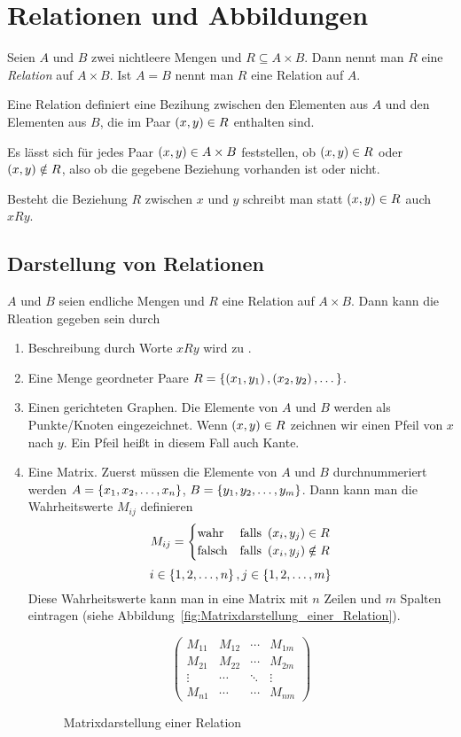 \chapter{Relationen und Abbildungen}
\begin{definition}[Relation]
Seien $A$ und $B$ zwei nichtleere Mengen und $R \subseteq A \times B$. Dann nennt man $R$ eine \emph{Relation} auf $A \times B$. Ist $A = B$ nennt man $R$ eine Relation auf $A$.
\end{definition}

Eine Relation definiert eine Bezihung zwischen den Elementen aus $A$ und  den Elementen aus $B$, die im Paar $\left(x, y\right) \in R$ enthalten sind.

Es lässt sich für jedes Paar $\left(x, y\right) \in A \times B$ feststellen, ob $\left(x, y\right) \in R$ oder $\left(x, y\right) \notin R$, also ob die gegebene Beziehung vorhanden ist oder nicht.

Besteht die Beziehung $R$ zwischen $x$ und $y$ schreibt man statt $\left(x, y\right) \in R$ auch $xRy$.

\section{Darstellung von Relationen}
$A$ und $B$ seien endliche Mengen und $R$ eine Relation auf $A \times B$. Dann kann die Rleation gegeben sein durch
\begin{enumerate}
\item Beschreibung durch Worte $xRy$ wird zu .
\item Eine Menge geordneter Paare $R = \left\{\left(x_1, y_1\right), \left(x_2, y_2\right), \dots\right\}$.
\item Einen gerichteten Graphen. Die Elemente von $A$ und $B$ werden als Punkte/Knoten eingezeichnet. Wenn $\left(x, y\right) \in R$ zeichnen wir einen Pfeil von $x$ nach $y$. Ein Pfeil heißt in diesem Fall auch Kante.
\item Eine Matrix. Zuerst müssen die Elemente von $A$ und $B$ durchnummeriert werden $A = \left\{x_1, x_2, \dots, x_n\right\}$, $B = \left\{y_1, y_2, \dots, y_m\right\}$. Dann kann man die Wahrheitswerte $M_{ij}$ definieren
	\[M_{ij} = 
	\begin{cases}
	\text{wahr} & \text{falls } \left(x_i, y_j\right) \in R\\
	\text{falsch} & \text{falls } \left(x_i, y_j\right) \notin R
	\end{cases}\]
	\[i \in \left\{1, 2, \dots, n\right\}, j \in \left\{1, 2, \dots, m\right\}\]
	Diese Wahrheitswerte kann man in eine Matrix mit $n$ Zeilen und $m$ Spalten eintragen (siehe Abbildung~\vref{fig:Matrixdarstellung_einer_Relation}).
	\begin{figure}[htb]
	\[\begin{pmatrix}
	M_{11} & M_{12} & \cdots & M_{1m}\\
	M_{21} & M_{22} & \cdots & M_{2m}\\
	\vdots & \cdots & \ddots & \vdots\\
	M_{n1} & \cdots & \cdots & M_{nm}
	\end{pmatrix}\]
	\caption{Matrixdarstellung einer Relation}
	\label{fig:Matrixdarstellung_einer_Relation}
	\end{figure}
\end{enumerate}

